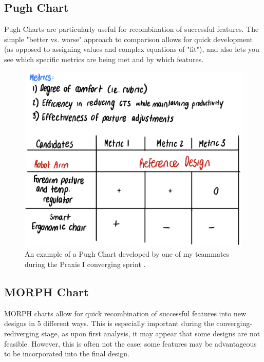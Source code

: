 \documentclass{report}
\begin{document}
\subsection{Pugh Chart}

Pugh Charts are particularly useful for recombination of successful features. The simple "better vs. worse" approach
to comparison allows for quick development (as opposed to assigning values and complex equations of "fit"), and also
lets you see which specific metrics are being met and by which features.

\begin{figure}[h]
    \centering
    \includegraphics[width=\textwidth/2]{images/pughchart.png}
    \hfill
    \caption{An example of a Pugh Chart developed by one of my teammates during the Praxis I converging sprint \cite{designcrit}.}
\end{figure}

\pagebreak

\subsection{MORPH Chart}

MORPH charts allow for quick recombination of successful features into new designs in 5 different ways. This is especially important during the
converging-rediverging stage, as upon first analysis, it may appear that some designs are not feasible. However, this is often not the case;
some features may be advantageous to be incorporated into the final design.
\end{document}
